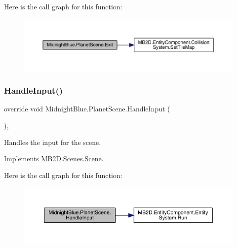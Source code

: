 Here is the call graph for this function\+:\nopagebreak
\begin{figure}[H]
\begin{center}
\leavevmode
\includegraphics[width=350pt]{class_midnight_blue_1_1_planet_scene_af3aab90a13294493e1f2cd29b0fb60e6_cgraph}
\end{center}
\end{figure}
\hypertarget{class_midnight_blue_1_1_planet_scene_a6c84a639f27b9f7510b514969d47d1bd}{}\label{class_midnight_blue_1_1_planet_scene_a6c84a639f27b9f7510b514969d47d1bd} 
\subsubsection{\texorpdfstring{Handle\+Input()}{HandleInput()}}
{\footnotesize\ttfamily override void Midnight\+Blue.\+Planet\+Scene.\+Handle\+Input (\begin{DoxyParamCaption}{ }\end{DoxyParamCaption})\hspace{0.3cm}{\ttfamily [inline]}, {\ttfamily [virtual]}}



Handles the input for the scene. 



Implements \hyperlink{class_m_b2_d_1_1_scenes_1_1_scene_a476de5a885408d27ff151044d20738c8}{M\+B2\+D.\+Scenes.\+Scene}.

Here is the call graph for this function\+:\nopagebreak
\begin{figure}[H]
\begin{center}
\leavevmode
\includegraphics[width=350pt]{class_midnight_blue_1_1_planet_scene_a6c84a639f27b9f7510b514969d47d1bd_cgraph}
\end{center}
\end{figure}
\hypertarget{class_midnight_blue_1_1_planet_scene_ac8b7e88283b22b87aa45f116b549e86f}{}\label{class_midnight_blue_1_1_planet_scene_ac8b7e88283b22b87aa45f116b549e86f} 
